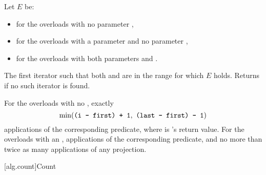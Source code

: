 \begin{itemdescr}
\pnum
Let $E$ be:
\begin{itemize}
\setlength{\emergencystretch}{1em}
\item {} for the overloads with no parameter ,
\item {} for the overloads with a parameter  and no parameter ,
\item {} for the overloads with both parameters  and .
\end{itemize}

\pnum
\returns
The first iterator 
such that both  and  are in the range 
for which $E$ holds.
Returns  if no such iterator is found.

\pnum
\complexity
For the overloads with no ,
exactly \[ \min(\texttt{(i - first) + 1}, \ \texttt{(last - first) - 1}) \]
applications of the corresponding predicate,
where  is 's return value.
For the overloads with an ,
 applications of the corresponding predicate,
and no more than twice as many applications of any projection.
\end{itemdescr}

[alg.count]{Count}

